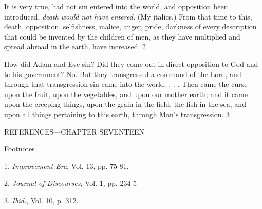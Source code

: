 It is very true, had not sin entered into the world, and opposition been introduced, \textit{death
would not have entered.} (My italics.) From that time to this, death, opposition, selfishness,
malice, anger, pride, darkness of every description that could be invented by the children of
men, as they have multiplied and spread abroad in the earth, have increased. 2

How did Adam and Eve sin? Did they come out in direct opposition to God and to his
government? No. But they transgressed a command of the Lord, and through that
transgression sin came into the world. . . . Then came the curse upon the fruit, upon the
vegetables, and upon our mother earth; and it came upon the creeping things, upon the grain
in the field, the fish in the sea, and upon all things pertaining to this earth, through Man's
transgression. 3

\newpage
REFERENCES—CHAPTER SEVENTEEN

Footnotes

1. \textit{Improvement Era}, Vol. 13, pp. 75-81.

2. \textit{Journal of Discourses}, Vol. 1, pp. 234-5

3. \textit{Ibid.}, Vol. 10, p. 312.

